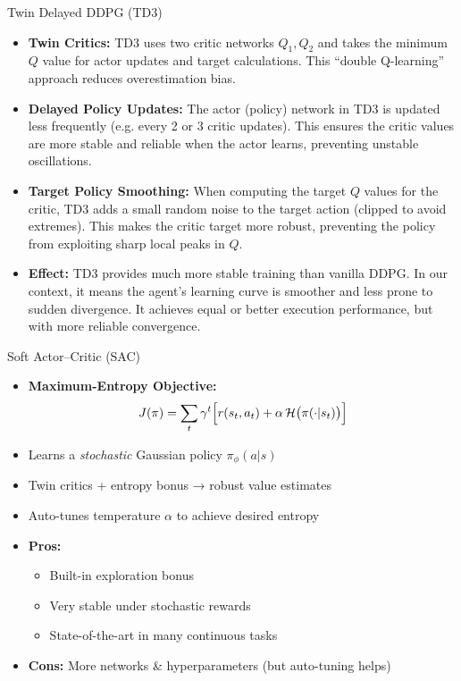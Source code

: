 \documentclass[11pt,aspectratio=169]{beamer}   %
\begin{document}
\begin{frame}{Twin Delayed DDPG (TD3)}
	\begin{itemize}
		\item \textbf{Twin Critics:} TD3 uses two critic networks $Q_1, Q_2$ and takes the minimum $Q$ value for actor updates and target calculations. This “double Q-learning” approach reduces overestimation bias.
		\item \textbf{Delayed Policy Updates:} The actor (policy) network in TD3 is updated less frequently (e.g. every 2 or 3 critic updates). This ensures the critic values are more stable and reliable when the actor learns, preventing unstable oscillations.
		\item \textbf{Target Policy Smoothing:} When computing the target $Q$ values for the critic, TD3 adds a small random noise to the target action (clipped to avoid extremes). This makes the critic target more robust, preventing the policy from exploiting sharp local peaks in $Q$.
		\item \textbf{Effect:} TD3 provides much more stable training than vanilla DDPG. In our context, it means the agent’s learning curve is smoother and less prone to sudden divergence. It achieves equal or better execution performance, but with more reliable convergence.
	\end{itemize}
\end{frame}

\begin{frame}{Soft Actor–Critic (SAC)}
	\begin{itemize}
		\item \textbf{Maximum-Entropy Objective:}
		\[
		J(\pi)=\sum_{t}\gamma^t\Bigl[r(s_t,a_t)+\alpha\,\mathcal{H}\bigl(\pi(\cdot|s_t)\bigr)\Bigr]
		\]
		\item Learns a \emph{stochastic} Gaussian policy $\pi_\phi(a|s)$
		\item Twin critics + entropy bonus → robust value estimates
		\item Auto-tunes temperature $\alpha$ to achieve desired entropy
		\item \textbf{Pros:}
		\begin{itemize}
			\item Built-in exploration bonus  
			\item Very stable under stochastic rewards  
			\item State-of-the-art in many continuous tasks  
		\end{itemize}
		\item \textbf{Cons:} More networks \& hyperparameters (but auto-tuning helps)
	\end{itemize}
\end{frame}
\end{document}

